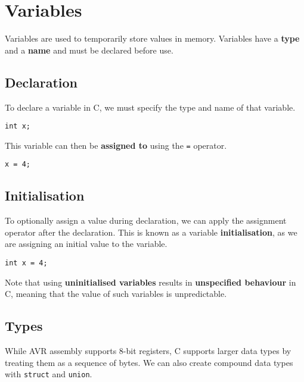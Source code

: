 \documentclass{report}
\begin{document}
\chapter{Variables}
Variables are used to temporarily store values in memory. Variables
have a \textbf{type} and a \textbf{name} and must be declared before
use.
\section{Declaration}
To declare a variable in C, we must specify the type and name of that
variable.
\begin{verbatim}
int x;
\end{verbatim}
This variable can then be \textbf{assigned to} using the
\texttt{=} operator.
\begin{verbatim}
x = 4;
\end{verbatim}
\section{Initialisation}
To optionally assign a value during declaration, we can apply the
assignment operator after the declaration. This is known as a variable
\textbf{initialisation}, as we are assigning an initial value to the
variable.
\begin{verbatim}
int x = 4;
\end{verbatim}
Note that using \textbf{uninitialised variables} results in
\textbf{unspecified behaviour} in C, meaning that the value of such
variables is unpredictable.
\section{Types}
While AVR assembly supports 8-bit registers, C supports larger data
types by treating them as a sequence of bytes. We can also create
compound data types with \texttt{struct} and
\texttt{union}.
\end{document}
